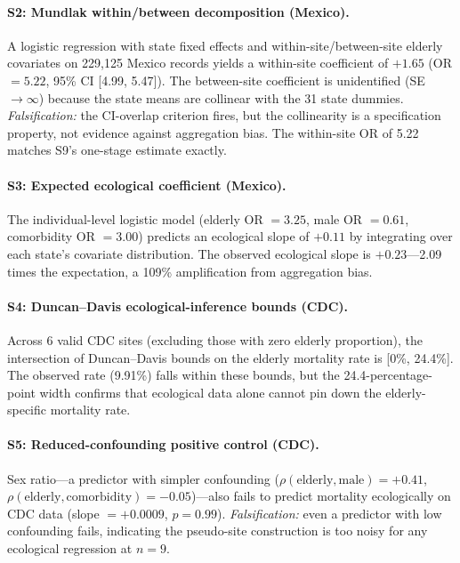 \documentclass{article}
\begin{document}
\paragraph{S2: Mundlak within/between decomposition (Mexico).}
A logistic regression with state fixed effects and within-site/between-site
elderly covariates on 229{,}125 Mexico records yields a within-site
coefficient of $+1.65$ (OR $= 5.22$, 95\% CI [4.99, 5.47]).  The
between-site coefficient is unidentified (SE $\to \infty$) because the
state means are collinear with the 31 state dummies.
\emph{Falsification:} the CI-overlap criterion fires, but the collinearity
is a specification property, not evidence against aggregation bias.
The within-site OR of 5.22 matches S9's one-stage estimate exactly.

\paragraph{S3: Expected ecological coefficient (Mexico).}
The individual-level logistic model (elderly OR $= 3.25$, male
OR $= 0.61$, comorbidity OR $= 3.00$) predicts an ecological slope
of $+0.11$ by integrating over each state's covariate distribution.
The observed ecological slope is $+0.23$---2.09 times the expectation,
a 109\% amplification from aggregation bias.

\paragraph{S4: Duncan--Davis ecological-inference bounds (CDC).}
Across 6 valid CDC sites (excluding those with zero elderly proportion),
the intersection of Duncan--Davis bounds on the elderly mortality rate
is [0\%, 24.4\%].  The observed rate (9.91\%) falls within these bounds,
but the 24.4-percentage-point width confirms that ecological data alone
cannot pin down the elderly-specific mortality rate.

\paragraph{S5: Reduced-confounding positive control (CDC).}
Sex ratio---a predictor with simpler confounding
($\rho(\text{elderly}, \text{male}) = +0.41$,
$\rho(\text{elderly}, \text{comorbidity}) = -0.05$)---also fails
to predict mortality ecologically on CDC data (slope $= +0.0009$,
$p = 0.99$).  \emph{Falsification:} even a predictor with low
confounding fails, indicating the pseudo-site construction is too
noisy for any ecological regression at $n = 9$.
\end{document}
